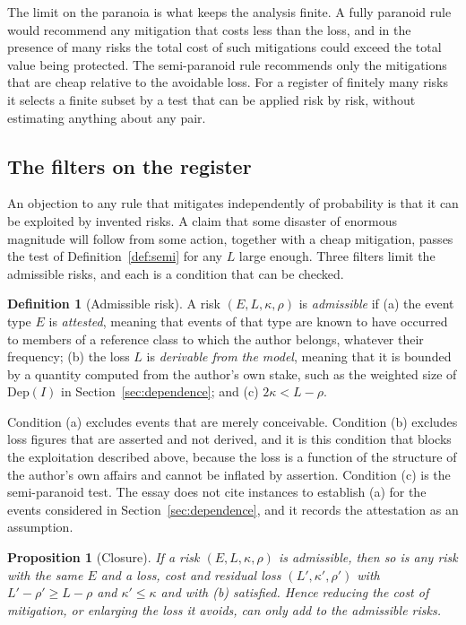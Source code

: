 \documentclass[11pt]{article}
\theoremstyle{plain}
\newtheorem{proposition}[theorem]{Proposition}
\theoremstyle{definition}
\newtheorem{definition}[theorem]{Definition}
\theoremstyle{remark}
\begin{document}
The limit on the paranoia is what keeps the analysis finite. A fully paranoid rule would recommend any mitigation that costs less than the loss, and in the presence of many risks the total cost of such mitigations could exceed the total value being protected. The semi-paranoid rule recommends only the mitigations that are cheap relative to the avoidable loss. For a register of finitely many risks it selects a finite subset by a test that can be applied risk by risk, without estimating anything about any pair.

\subsection{The filters on the register}

An objection to any rule that mitigates independently of probability is that it can be exploited by invented risks. A claim that some disaster of enormous magnitude will follow from some action, together with a cheap mitigation, passes the test of Definition~\ref{def:semi} for any $L$ large enough. Three filters limit the admissible risks, and each is a condition that can be checked.

\begin{definition}[Admissible risk]\label{def:admissible}
A risk $(E,L,\kappa,\rho)$ is \emph{admissible} if (a) the event type $E$ is \emph{attested}, meaning that events of that type are known to have occurred to members of a reference class to which the author belongs, whatever their frequency; (b) the loss $L$ is \emph{derivable from the model}, meaning that it is bounded by a quantity computed from the author's own stake, such as the weighted size of $\mathrm{Dep}(I)$ in Section~\ref{sec:dependence}; and (c) $2\kappa<L-\rho$.
\end{definition}

Condition (a) excludes events that are merely conceivable. Condition (b) excludes loss figures that are asserted and not derived, and it is this condition that blocks the exploitation described above, because the loss is a function of the structure of the author's own affairs and cannot be inflated by assertion. Condition (c) is the semi-paranoid test. The essay does not cite instances to establish (a) for the events considered in Section~\ref{sec:dependence}, and it records the attestation as an assumption.

\begin{proposition}[Closure]\label{prop:closure}
If a risk $(E,L,\kappa,\rho)$ is admissible, then so is any risk with the same $E$ and a loss, cost and residual loss $(L',\kappa',\rho')$ with $L'-\rho'\ge L-\rho$ and $\kappa'\le\kappa$ and with (b) satisfied. Hence reducing the cost of mitigation, or enlarging the loss it avoids, can only add to the admissible risks.
\end{proposition}
\end{document}
